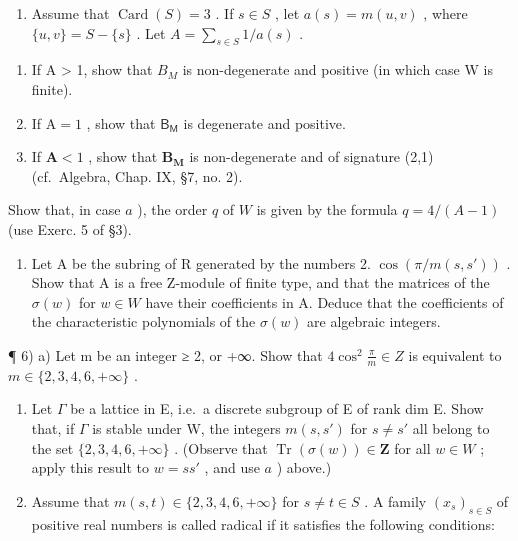 \begin{enumerate}
\def\labelenumi{\arabic{enumi})}
\setcounter{enumi}{3}
\tightlist
\item
  Assume that \(\operatorname{Card}(S) = 3\) . If \(s \in S\) , let \(a(s) = m(u, v)\) , where \(\{u, v\} = S - \{s\}\) . Let \(A = \sum_{s \in S} 1 / a(s)\) .
\end{enumerate}

\begin{enumerate}
\def\labelenumi{\alph{enumi})}
\item
  If A \textgreater{} 1, show that \(B_{M}\) is non-degenerate and positive (in which case W is finite).
\item
  If \(\mathrm{A} = 1\) , show that \(\mathsf{B}_{\mathsf{M}}\) is degenerate and positive.
\item
  If \(\mathbf{A} < 1\) , show that \(\mathbf{B}_{\mathbf{M}}\) is non-degenerate and of signature (2,1) (cf.~Algebra, Chap. IX, §7, no. 2).
\end{enumerate}

Show that, in case \(a\) ), the order \(q\) of \(W\) is given by the formula \(q = 4 / (A - 1)\) (use Exerc. 5 of §3).

\begin{enumerate}
\def\labelenumi{\arabic{enumi})}
\setcounter{enumi}{4}
\tightlist
\item
  Let A be the subring of R generated by the numbers 2. \(\cos(\pi/m(s, s'))\) . Show that A is a free Z-module of finite type, and that the matrices of the \(\sigma(w)\) for \(w \in W\) have their coefficients in A. Deduce that the coefficients of the characteristic polynomials of the \(\sigma(w)\) are algebraic integers.
\end{enumerate}

¶ 6) a) Let m be an integer ≥ 2, or +∞. Show that \(4 \cos^{2} \frac{\pi}{m} \in Z\) is equivalent to \(m \in \{2, 3, 4, 6, +\infty\}\) .

\begin{enumerate}
\def\labelenumi{\alph{enumi})}
\setcounter{enumi}{1}
\item
  Let \(\Gamma\) be a lattice in E, i.e.~a discrete subgroup of E of rank dim E. Show that, if \(\Gamma\) is stable under W, the integers \(m(s, s')\) for \(s \neq s'\) all belong to the set \(\{2, 3, 4, 6, +\infty\}\) . (Observe that \(\operatorname{Tr}(\sigma(w)) \in \mathbf{Z}\) for all \(w \in W\) ; apply this result to \(w = ss'\) , and use \(a\) ) above.)
\item
  Assume that \(m(s, t) \in \{2, 3, 4, 6, +\infty\}\) for \(s \neq t \in S\) . A family \((x_s)_{s \in S}\) of positive real numbers is called radical if it satisfies the following conditions:
\end{enumerate}

